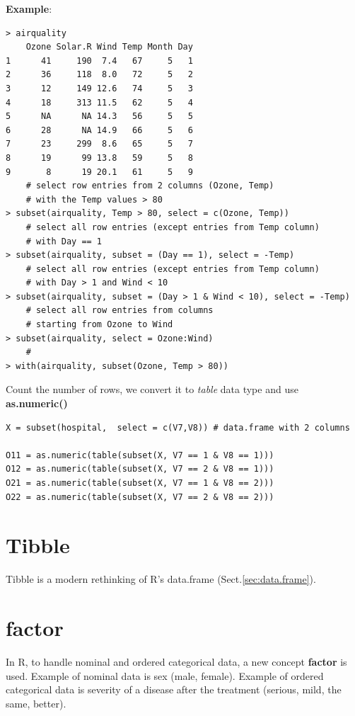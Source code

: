 {\bf Example}:
\begin{lstlisting}
> airquality
    Ozone Solar.R Wind Temp Month Day
1      41     190  7.4   67     5   1
2      36     118  8.0   72     5   2
3      12     149 12.6   74     5   3
4      18     313 11.5   62     5   4
5      NA      NA 14.3   56     5   5
6      28      NA 14.9   66     5   6
7      23     299  8.6   65     5   7
8      19      99 13.8   59     5   8
9       8      19 20.1   61     5   9
    # select row entries from 2 columns (Ozone, Temp) 
    # with the Temp values > 80
> subset(airquality, Temp > 80, select = c(Ozone, Temp))
    # select all row entries (except entries from Temp column)
    # with Day == 1 
> subset(airquality, subset = (Day == 1), select = -Temp)
    # select all row entries (except entries from Temp column)
    # with Day > 1 and Wind < 10
> subset(airquality, subset = (Day > 1 & Wind < 10), select = -Temp)
    # select all row entries from columns 
    # starting from Ozone to Wind 
> subset(airquality, select = Ozone:Wind)
    # 
> with(airquality, subset(Ozone, Temp > 80))
\end{lstlisting}

Count the number of rows, we convert it to {\it table} data type and
use {\bf as.numeric()}
\begin{lstlisting}
X = subset(hospital,  select = c(V7,V8)) # data.frame with 2 columns

O11 = as.numeric(table(subset(X, V7 == 1 & V8 == 1)))
O12 = as.numeric(table(subset(X, V7 == 2 & V8 == 1)))
O21 = as.numeric(table(subset(X, V7 == 1 & V8 == 2)))
O22 = as.numeric(table(subset(X, V7 == 2 & V8 == 2)))

\end{lstlisting}

\section{Tibble}
\label{sec:tibble}

Tibble is a modern rethinking of R's data.frame (Sect.\ref{sec:data.frame}).


\section{factor}
\label{sec:factor}

In R, to handle nominal and ordered categorical data, a new concept
{\bf factor} is used. Example of nominal data is sex (male,
female). Example of ordered categorical data is severity of a disease
after the treatment (serious, mild, the same, better).

